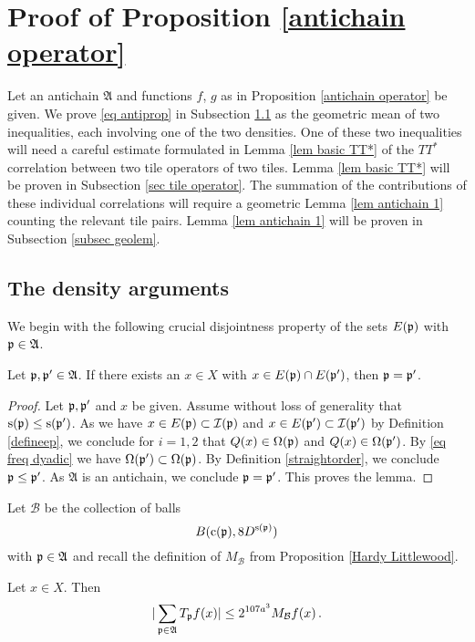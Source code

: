 {\section{Proof of  Proposition \ref{antichain operator}}

\label{antichainboundary}

Let an antichain $\mathfrak{A}$
and functions $f$, $g$ as in Proposition \ref{antichain operator} be given.
We prove \eqref{eq antiprop}
in Subsection \ref{sec TT* T*T}
as the geometric mean of two inequalities,
each involving one of the two densities.
One of these two inequalities will need a careful estimate formulated in
Lemma \ref{lem basic TT*} of
the $TT^*$ correlation between two tile operators of two tiles.
Lemma \ref{lem basic TT*} will be proven in
Subsection \ref{sec tile operator}.
The summation of the contributions of these individual correlations will require a
geometric Lemma \ref{lem antichain 1} counting the relevant tile pairs.
Lemma \ref{lem antichain 1} will be proven in Subsection
\ref{subsec geolem}.






\subsection{The density  arguments}\label{sec TT* T*T}

We begin with the following crucial disjointness property of the sets $E(\mathfrak p)$ with $\mathfrak p \in \mathfrak{A}$.
\begin{lemma}
\label{lem antichain -1}
Let $\mathfrak p,\mathfrak p'\in \mathfrak{A}$.
If there exists an $x\in X$ with $x\in  E(\mathfrak p)\cap E(\mathfrak p')$,
then $\mathfrak p= \mathfrak p'$.
\end{lemma}
\begin{proof}
Let $\mathfrak p,\mathfrak p'$ and $x$ be given.
Assume without loss of generality that $\mathrm{s}(\mathfrak p)\le \mathrm{s}(\mathfrak p')$.
As we have $x\in E(\mathfrak p)\subset \mathcal{I}(\mathfrak p)$  and $x\in E(\mathfrak p')\subset \mathcal{I}(\mathfrak p')$ by Definition \eqref{defineep}, we conclude
for $i=1,2$ that
${Q}(x)\in\Omega(\mathfrak p)$ and ${Q}(x)\in\Omega(\mathfrak p')$. By \eqref{eq freq dyadic} we have $\Omega(\mathfrak p')\subset \Omega(\mathfrak p)$. By Definition
\eqref{straightorder}, we conclude $\mathfrak p\le \mathfrak p'$. As $\mathfrak{A}$ is an antichain, we conclude $\mathfrak p=\mathfrak p'$.
This proves the lemma.
\end{proof}



Let $\mathcal{B}$ be the collection of balls
\begin{equation}
    B(\mathrm{c}(\mathfrak p), 8D^{\mathrm{s}(\mathfrak p)})
\end{equation}
with $\mathfrak p\in \mathfrak{A}$ and recall the definition of
$M_{\mathcal{B}}$ from Proposition \ref{Hardy Littlewood}.
\begin{lemma}\label{lem hlmbound}
Let $x\in X$.
Then
\begin{equation}\label{hlmbound}
  | \sum_{\mathfrak p \in \mathfrak{A}}T_{\mathfrak p} f(x)|\le 2^{107 a^3} M_{\mathcal{B}} f (x) \, .
\end{equation}
\end{lemma}



}
